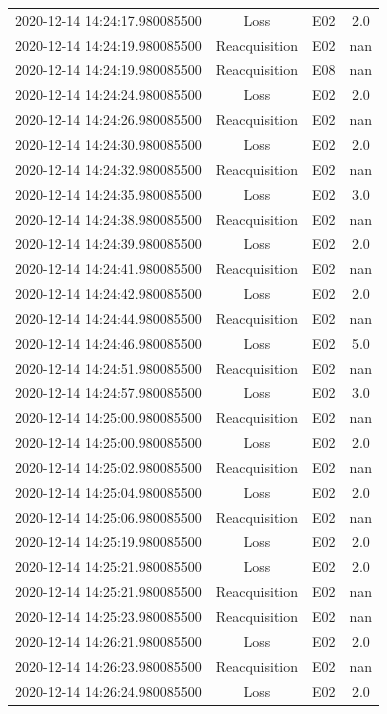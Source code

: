 \begin{enumerate}
\begin{longtabu}{cccc}
2020{-}12{-}14 14:24:17.980085500&Loss&E02&2.0\\%
2020{-}12{-}14 14:24:19.980085500&Reacquisition&E02&nan\\%
2020{-}12{-}14 14:24:19.980085500&Reacquisition&E08&nan\\%
2020{-}12{-}14 14:24:24.980085500&Loss&E02&2.0\\%
2020{-}12{-}14 14:24:26.980085500&Reacquisition&E02&nan\\%
2020{-}12{-}14 14:24:30.980085500&Loss&E02&2.0\\%
2020{-}12{-}14 14:24:32.980085500&Reacquisition&E02&nan\\%
2020{-}12{-}14 14:24:35.980085500&Loss&E02&3.0\\%
2020{-}12{-}14 14:24:38.980085500&Reacquisition&E02&nan\\%
2020{-}12{-}14 14:24:39.980085500&Loss&E02&2.0\\%
2020{-}12{-}14 14:24:41.980085500&Reacquisition&E02&nan\\%
2020{-}12{-}14 14:24:42.980085500&Loss&E02&2.0\\%
2020{-}12{-}14 14:24:44.980085500&Reacquisition&E02&nan\\%
2020{-}12{-}14 14:24:46.980085500&Loss&E02&5.0\\%
2020{-}12{-}14 14:24:51.980085500&Reacquisition&E02&nan\\%
2020{-}12{-}14 14:24:57.980085500&Loss&E02&3.0\\%
2020{-}12{-}14 14:25:00.980085500&Reacquisition&E02&nan\\%
2020{-}12{-}14 14:25:00.980085500&Loss&E02&2.0\\%
2020{-}12{-}14 14:25:02.980085500&Reacquisition&E02&nan\\%
2020{-}12{-}14 14:25:04.980085500&Loss&E02&2.0\\%
2020{-}12{-}14 14:25:06.980085500&Reacquisition&E02&nan\\%
2020{-}12{-}14 14:25:19.980085500&Loss&E02&2.0\\%
2020{-}12{-}14 14:25:21.980085500&Loss&E02&2.0\\%
2020{-}12{-}14 14:25:21.980085500&Reacquisition&E02&nan\\%
2020{-}12{-}14 14:25:23.980085500&Reacquisition&E02&nan\\%
2020{-}12{-}14 14:26:21.980085500&Loss&E02&2.0\\%
2020{-}12{-}14 14:26:23.980085500&Reacquisition&E02&nan\\%
2020{-}12{-}14 14:26:24.980085500&Loss&E02&2.0\\%

\end{longtabu}
\end{enumerate}

